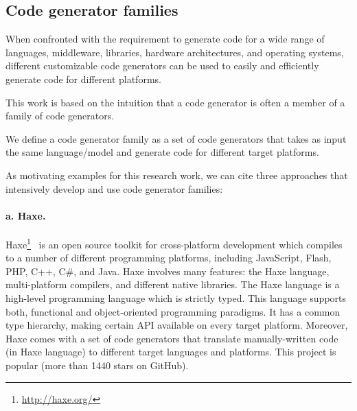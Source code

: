 \subsection{Code generator families}
When confronted with the requirement to generate code for a wide range of languages, middleware, libraries, hardware architectures, and operating systems, different customizable code generators can be used to easily and efficiently  generate code for different platforms.

This work is based on the intuition that a code generator is often a member of a family of code generators\cite{chae2008building}.

\begin{mydef}
	We define a code generator family as a set of code generators that takes as input the same language/model and generate code for different target platforms.
\end{mydef}

As motivating examples for this research work, we can cite three approaches that intensively develop and use code generator families: 
\paragraph{a. Haxe.} 	Haxe\footnote{\url{http://haxe.org/}}~\cite{dasnois2011haxe} is an open source toolkit for cross-platform development which compiles to a number of different programming platforms, including JavaScript, Flash, PHP, C++, C\#, and Java. Haxe involves many features: the Haxe language, multi-platform compilers, and different native libraries. The Haxe language is a high-level programming language which is strictly typed. This language supports both, functional and object-oriented programming paradigms. It has a common type hierarchy, making certain API available on every target platform. Moreover, Haxe comes with a set of code generators that translate manually-written code (in Haxe language) to different target languages and platforms.  
This project is popular (more than \num{1440} stars on GitHub).

